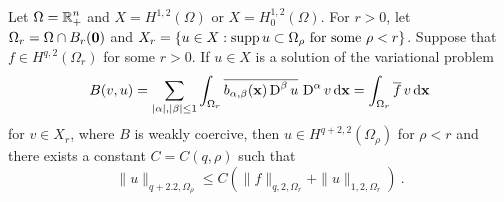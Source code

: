 \begin{prop} \label{ell_regular_Rnp}
Let $\displaystyle \Omega = \mathbb{R}^n_+$ and
$\displaystyle X = H^{1,2}(\Omega)$ or
$\displaystyle X = H^{1,2}_0(\Omega)$.  For $r>0$, let
$\displaystyle \Omega_r = \Omega \cap B_r(\mathbf{0})$
and
$\displaystyle X_r = \left\{ u \in X : \operatorname{supp} u \subset \Omega_\rho \
\text{for some} \ \rho <r \right\}$.
Suppose that $\displaystyle f \in H^{q,2}(\Omega_r)$ for some $r>0$.
If $u\in X$ is a solution of the variational problem
\begin{equation} \label{ell_var_reg}
B(v,u) =
\sum_{|\alpha|,|\beta|\leq 1}
\int_{\Omega_r} \overline{b_{\alpha,\beta}(\mathbf{x}) \operatorname{D}^\beta u}\, \operatorname{D}^\alpha v
\,\mathrm{d}{\mathbf{x}} = \int_{\Omega_r} \overline{f}\,v \,\mathrm{d}{\mathbf{x}}
\end{equation}
for $\displaystyle v \in X_r$, where $B$ is weakly coercive, then
$\displaystyle u\in H^{q+2,2}(\Omega_\rho)$ for
$\rho<r$ and there exists a constant $C = C(q,\rho)$ such that
\[
\|u\|_{q+2.2,\Omega_\rho} \leq C \left( \|f\|_{q,2,\Omega_r} +
\|u\|_{1,2,\Omega_r} \right) \ .
\]
\end{prop}


